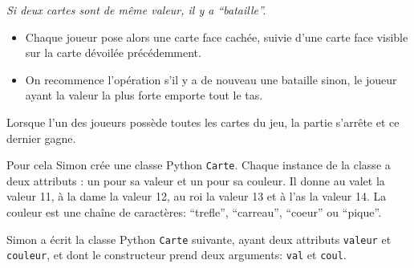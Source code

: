 \documentclass[
  a4paper,
  DIV=11,
  numbers=noendperiod]{scrartcl}
\providecommand{\tightlist}{%
  \setlength{\itemsep}{0pt}\setlength{\parskip}{0pt}}\usepackage{longtable,booktabs,array}
\begin{document}
\emph{Si deux cartes sont de même valeur, il y a ``bataille''.}

\begin{itemize}
\tightlist
\item
  Chaque joueur pose alors une carte face cachée, suivie d'une carte
  face visible sur la carte dévoilée précédemment.
\item
  On recommence l'opération s'il y a de nouveau une bataille sinon, le
  joueur ayant la valeur la plus forte emporte tout le tas.
\end{itemize}

Lorsque l'un des joueurs possède toutes les cartes du jeu, la partie
s'arrête et ce dernier gagne.

Pour cela Simon crée une classe Python \texttt{Carte}. Chaque instance
de la classe a deux attributs : un pour sa valeur et un pour sa couleur.
Il donne au valet la valeur 11, à la dame la valeur 12, au roi la valeur
13 et à l'as la valeur 14. La couleur est une chaîne de caractères:
``trefle'', ``carreau'', ``coeur'' ou ``pique''.

Simon a écrit la classe Python \texttt{Carte} suivante, ayant deux
attributs \texttt{valeur} et \texttt{couleur}, et dont le constructeur
prend deux arguments: \texttt{val} et \texttt{coul}.
\end{document}
